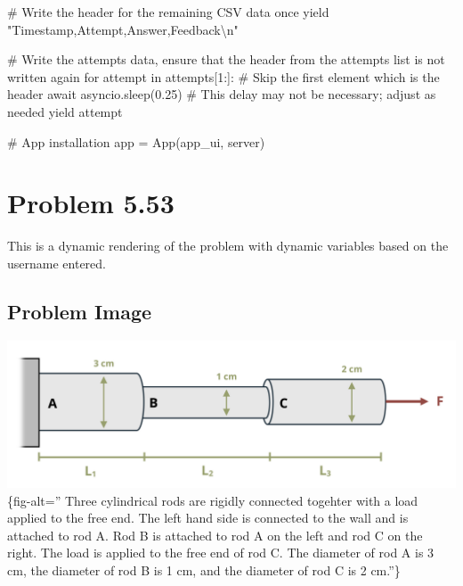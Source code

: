 \documentclass[
  letterpaper,
  DIV=11,
  numbers=noendperiod]{scrreprt}
\newenvironment{Shaded}{\begin{snugshade}}{\end{snugshade}}
\newcommand{\NormalTok}[1]{\textcolor[rgb]{0.00,0.23,0.31}{#1}}
\begin{document}
\begin{Shaded}
\begin{Highlighting}[]
\NormalTok{        \# Write the header for the remaining CSV data once}
\NormalTok{        yield "Timestamp,Attempt,Answer,Feedback\textbackslash{}n"}
        
\NormalTok{        \# Write the attempts data, ensure that the header from the attempts list is not written again}
\NormalTok{        for attempt in attempts[1:]:  \# Skip the first element which is the header}
\NormalTok{            await asyncio.sleep(0.25)  \# This delay may not be necessary; adjust as needed}
\NormalTok{            yield attempt}


\NormalTok{\# App installation}
\NormalTok{app = App(app\_ui, server)}
\end{Highlighting}
\end{Shaded}

\chapter*{Problem 5.53}\label{problem-5.53}


This is a dynamic rendering of the problem with dynamic variables based
on the username entered.

\section*{Problem Image}\label{problem-image-56}


\includegraphics{images/225.png}\{fig-alt='' Three cylindrical rods are
rigidly connected togehter with a load applied to the free end. The left
hand side is connected to the wall and is attached to rod A. Rod B is
attached to rod A on the left and rod C on the right. The load is
applied to the free end of rod C. The diameter of rod A is 3 cm, the
diameter of rod B is 1 cm, and the diameter of rod C is 2 cm.''\}
\end{document}
